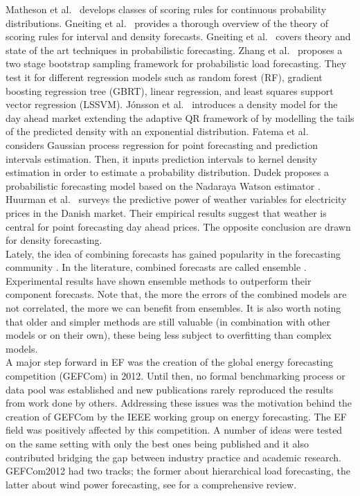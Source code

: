 Matheson et al.\ \cite{matheson1976scoring} develops classes of scoring rules for continuous probability distributions.
Gneiting et al.\ \cite{gneiting2007strictly}
provides a thorough overview of the theory of scoring rules for interval and density forecasts.
Gneiting et al.\ \cite{gneiting2014probabilistic}
covers theory and state of the art techniques in probabilistic forecasting.
Zhang et al.\ \cite{zhang2020two} proposes a two stage bootstrap sampling framework for probabilistic load forecasting. They test it for different regression models such as random forest (RF), gradient boosting regression tree (GBRT), linear regression, and least squares support vector regression (LSSVM).
Jónsson et al.\ \cite{jonsson2014predictive}
introduces a density model for the day ahead market extending the adaptive QR framework of \cite{moller2008time} by modelling the tails of the predicted density with an exponential distribution.
Fatema et al.\ \cite{fatema2023probabilistic} considers Gaussian process regression for point forecasting and prediction intervals estimation. Then, it inputs prediction intervals to kernel density estimation in order to estimate a probability distribution.
Dudek \cite{dudek2018probabilistic} proposes a probabilistic forecasting model based on the Nadaraya Watson estimator \cite{nadaraya1964estimating,watson1964smooth}.
Huurman et al.\ \cite{huurman2012power} surveys the predictive power of weather variables for electricity prices in the Danish market. Their empirical results suggest that weather is central for point forecasting day ahead prices. The opposite conclusion are drawn for density forecasting.
\\
Lately, the idea of combining forecasts has gained popularity in the forecasting community \cite{forecasting_big}. In the literature, combined forecasts are called ensemble \cite{gneiting_weather_ensemble}.
Experimental results have shown ensemble methods to outperform their component forecasts.
Note that, the more the errors of the combined models are not correlated, the more we can benefit from ensembles.
It is also worth noting that older and simpler methods are still valuable (in combination with other models or on their own), these being less subject to overfitting than complex models.
\\
A major step forward in EF was the creation of the global energy forecasting competition (GEFCom) in 2012. Until then, no formal benchmarking process or data pool was established and new publications rarely reproduced the results from work done by others. Addressing these issues was the motivation behind the creation of GEFCom by the IEEE working group on energy forecasting. The EF field was positively affected by this competition. A number of ideas were tested on the same setting with only the best ones being published and it also contributed bridging the gap between industry practice and academic research. GEFCom2012 had two tracks; the former about hierarchical load forecasting, the latter about wind power forecasting, see \cite{hong2014global} for a comprehensive review. 
